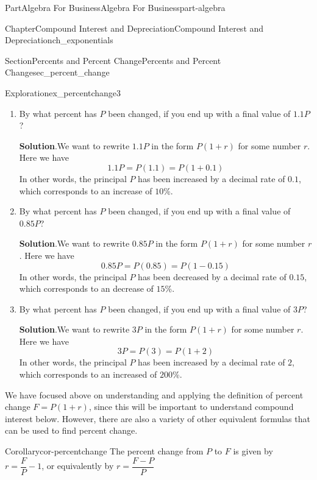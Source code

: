 \documentclass[oneside,10pt,]{tufte-book}
\newcommand{\blocktitlefont}{\relax}
\numberwithin{equation}{chapter}
\begin{document}
\begin{partptx}{Part}{Algebra For Business}{}{Algebra For Business}{}{}{part-algebra}
\begin{chapterptx}{Chapter}{Compound Interest and Depreciation}{}{Compound Interest and Depreciation}{}{}{ch_exponentials}
\begin{sectionptx}{Section}{Percents and Percent Change}{}{Percents and Percent Change}{}{}{sec_percent_change}
\begin{exploration}{Exploration}{}{ex_percentchange3}
\begin{enumerate}[font=\bfseries,label=(\alph*),ref=\alph*]%
\item{}By what percent has \(P\) been changed, if you end up with a final value of \(1.1 P\)?%
\par\smallskip%
\noindent\textbf{\blocktitlefont Solution}.\hypertarget{ex_percentchange3-2-2}{}\quad{}We want to rewrite \(1.1 P\) in the form \(P(1+r)\) for some number \(r\). Here we have%
\begin{equation*}
1.1P = P(1.1) = P(1 + 0.1)
\end{equation*}
In other words, the principal \(P\) has been increased by a decimal rate of \(0.1\), which corresponds to an increase of \(10 \)\%.%
\item{}By what percent has \(P\) been changed, if you end up with a final value of \(0.85 P\)?%
\par\smallskip%
\noindent\textbf{\blocktitlefont Solution}.\hypertarget{ex_percentchange3-3-2}{}\quad{}We want to rewrite \(0.85 P\) in the form \(P(1+r)\) for some number \(r\). Here we have%
\begin{equation*}
0.85P = P(0.85) = P(1 - 0.15)
\end{equation*}
In other words, the principal \(P\) has been decreased by a decimal rate of \(0.15\), which corresponds to an decrease of \(15 \)\%.%
\item{}By what percent has \(P\) been changed, if you end up with a final value of \(3 P\)?%
\par\smallskip%
\noindent\textbf{\blocktitlefont Solution}.\hypertarget{ex_percentchange3-4-2}{}\quad{}We want to rewrite \(3 P\) in the form \(P(1+r)\) for some number \(r\). Here we have%
\begin{equation*}
3P = P(3) = P(1 +2)
\end{equation*}
In other words, the principal \(P\) has been increased by a decimal rate of \(2\), which corresponds to an increased of \(200 \)\%.%
\end{enumerate}%
\end{exploration}%
We have focused above on understanding and applying the definition of percent change \(F = P(1+r)\), since this will be important to understand compound interest below. However, there are also a variety of other equivalent formulas that can be used to find percent change.%
\begin{corollary}{Corollary}{}{}{cor-percentchange}%
The percent change from \(P\) to \(F\) is given by \(r = \dfrac{F}{P}-1\), or equivalently by \(r = \dfrac{F-P}{P}\)%

\end{corollary}
\end{sectionptx}
\end{chapterptx}
\end{partptx}
\end{document}
